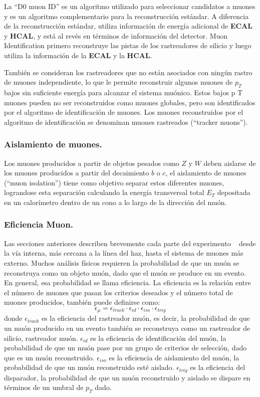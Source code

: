 La ``D0 muon ID'' es un algoritmo utilizado para seleccionar candidatos a muones y es un algoritmo complementario para la reconstrucción estándar. A diferencia de la reconstrucción estándar, utiliza información de energía adicional de \textbf{ECAL} y \textbf{HCAL}, y está al revés en términos de información del detector. Muon Identification primero reconstruye las pistas de los rastreadores de silicio y luego utiliza la información de la \textbf{ECAL} y la \textbf{HCAL}.

También se consideran los rastreadores que no están asociados con ningún rastro de muones independiente, lo que le permite reconstruir algunos muones de $p_T$ bajos sin suficiente energía para alcanzar el sistema muónico. Estos bajos p T muones pueden no ser reconstruidos como muones globales, pero son identificados por el algoritmo de identificación de muones. Los muones reconstruidos por el algoritmo de identificación se denominan muones rastreados (``tracker muons'').

\subsubsection{Aislamiento de muones.}

Los muones producidos a partir de objetos pesados como $Z$ y $W$ deben aislarse de los muones producidos a partir del decaimiento $b$ o $c$, el aislamiento de muones (``muon isolation'') tiene como objetivo separar estos diferentes muones, lograndose esta separación calculando la energía transversal total $E_T$ depositada en un calorímetro dentro de un cono a lo largo de la dirección del muón.

\subsubsection{Eficiencia Muon.}

Las secciones anteriores describen brevemente cada parte del experimento \CMS ~ desde la vía interna, más cercana a la línea del haz, hasta el sistema de muones más externo. Muchos análisis físicos requieren la probabilidad de que un muón se reconstruya como un objeto muón, dado que el muón se produce en un evento. En general, esa probabilidad se llama eficiencia. La eficiencia es la relación entre el número de muones que pasan los criterios deseados y el número total de muones producidos, también puede definirse como:
\begin{equation}
\epsilon_\mu = \epsilon_{track} \cdot \epsilon_{id} \cdot 
\epsilon_{iso} \cdot  \epsilon_{trig}
\end{equation}
donde $\epsilon_{track}$ es la eficiencia del rastreador muón, es decir, la probabilidad de que un muón producido en un evento también se reconstruya como un rastreador de silicio, rastreador muón. $\epsilon_{id}$ es la eficiencia de identificación del muón, la probabilidad de que un muón pase por un grupo de criterios de selección, dado que es un muón reconstruido. $\epsilon_{iso}$ es la eficiencia de aislamiento del muón, la probabilidad de que un muón reconstruido esté aislado. $\epsilon_{trig}$ es la eficiencia del disparador, la probabilidad de que un muón reconstruido y aislado se dispare en términos de un umbral de $p_T$ dado.

